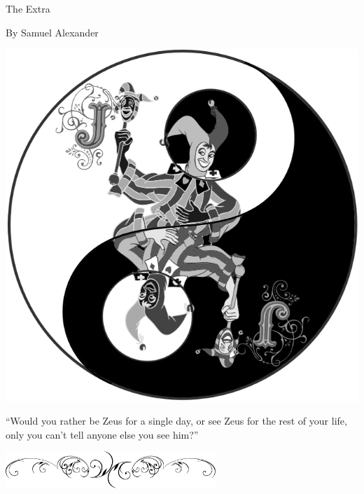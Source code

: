 \documentclass[oneside]{book}
\begin{document}
\begin{titlepage}

{
\center
\Huge
The Extra
\par
}

\vspace{.25in}
{
\center
\Large
By Samuel Alexander
\par
}

\vspace{-3.5in}

{
\center
\hspace{2in}
\includegraphics[width=600px,natwidth=840px,natheight=840px]{joker3.png}
\par
}

\vspace{.25in}
{
\center
``Would you rather be Zeus for a single day,
or see Zeus for the rest of your life,
only you can't tell anyone else you see him?''
\par
}

\end{titlepage}

\clearpage

\thispagestyle{empty}

{
\center
\includegraphics[width=300px]{slashdiv.eps}
\par
}
\end{document}
